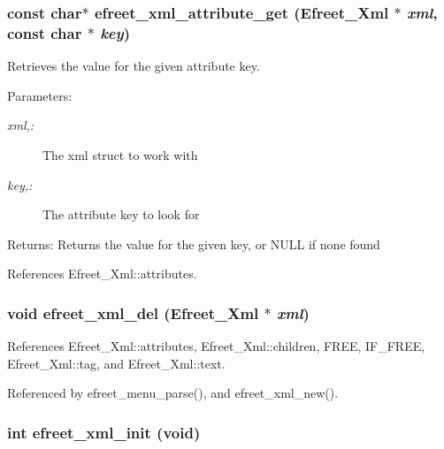 \subsubsection{\setlength{\rightskip}{0pt plus 5cm}const char$\ast$ efreet\_\-xml\_\-attribute\_\-get ({\bf Efreet\_\-Xml} $\ast$ {\em xml}, \/  const char $\ast$ {\em key})}\label{efreet__xml_8c_bb8a77ca97f883d4b60c14e47099272e}


Retrieves the value for the given attribute key. 

\begin{Desc}
\item[Parameters:]
\begin{description}
\item[{\em xml,:}]The xml struct to work with \item[{\em key,:}]The attribute key to look for \end{description}
\end{Desc}
\begin{Desc}
\item[Returns:]Returns the value for the given key, or NULL if none found \end{Desc}


References Efreet\_\-Xml::attributes.
\subsubsection{\setlength{\rightskip}{0pt plus 5cm}void efreet\_\-xml\_\-del ({\bf Efreet\_\-Xml} $\ast$ {\em xml})}\label{efreet__xml_8c_43503b3ca04624a604f71e023dbc1fb8}




References Efreet\_\-Xml::attributes, Efreet\_\-Xml::children, FREE, IF\_\-FREE, Efreet\_\-Xml::tag, and Efreet\_\-Xml::text.

Referenced by efreet\_\-menu\_\-parse(), and efreet\_\-xml\_\-new().
\subsubsection{\setlength{\rightskip}{0pt plus 5cm}int efreet\_\-xml\_\-init (void)}\label{efreet__xml_8c_7a2ad4fd7dfefb664c99f198d880d606}




